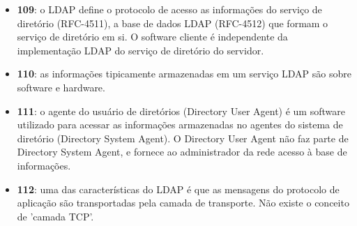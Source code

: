 \begin{itemize}
\item{\bf }{\bf 109}: o LDAP define o protocolo de acesso as informações do
serviço de diretório (RFC-4511), a base de dados LDAP (RFC-4512) que formam o
serviço de diretório em si. O software cliente é independente da implementação
LDAP do serviço de diretório do servidor.

\item{\bf }{\bf 110}: as informações tipicamente armazenadas em um serviço LDAP
são sobre software e hardware.

\item{\bf }{\bf 111}: o agente do usuário de diretórios (Directory User Agent)
é um software utilizado para acessar as informações armazenadas no agentes
do sistema de diretório (Directory System Agent). O Directory User Agent não
faz parte de Directory System Agent, e fornece ao administrador da rede
acesso à base de informações.

\item{\bf }{\bf 112}: uma das características do LDAP é que as mensagens do
protocolo de aplicação são transportadas pela camada de transporte. Não
existe o conceito de 'camada TCP'.
\end{itemize}
